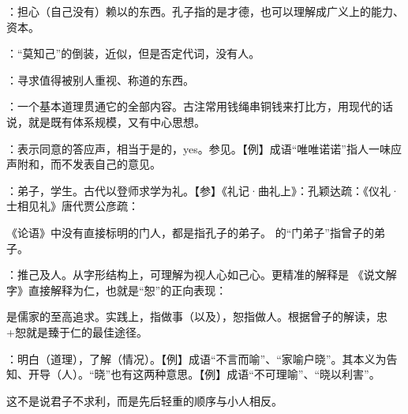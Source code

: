 {
\item {}：担心（自己没有）赖以的东西。孔子指的是才德，也可以理解成广义上的能力、资本。
\item {}：“莫知己”的倒装，近似，但是否定代词，没有人。
\item {}：寻求值得被别人重视、称道的东西。
}
{}


{
\begin{lyitemize}
\item {}：一个基本道理贯通它的全部内容。古注常用钱绳串铜钱来打比方，用现代的话说，就是既有体系规模，又有中心思想。
\item {}：表示同意的答应声，相当于是的，yes。参见。【例】成语“唯唯诺诺”指人一味应声附和，而不发表自己的意见。
\item {}：弟子，学生。古代以登师求学为礼。【参】《礼记·曲礼上》：孔颖达疏：《仪礼·士相见礼》唐代贾公彦疏：

《论语》中没有直接标明的门人，都是指孔子的弟子。 的“门弟子”指曾子的弟子。
\item {}：推己及人。从字形结构上，可理解为视人心如己心。更精准的解释是  《说文解字》直接解释为仁，也就是“恕”的正向表现： 
\end{lyitemize}
是儒家的至高追求。实践上，指做事（以及），恕指做人。根据曾子的解读，忠+恕就是臻于仁的最佳途径。
}
{
} %


{
\item {}：明白（道理），了解（情况）。【例】成语“不言而喻”、“家喻户晓”。其本义为告知、开导（人）。“晓”也有这两种意思。【例】成语“不可理喻”、“晓以利害”。

这不是说君子不求利，而是先后轻重的顺序与小人相反。
}
{}


